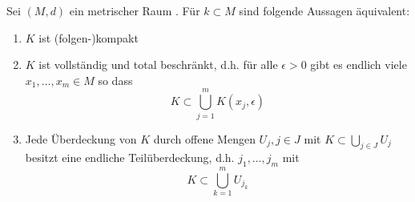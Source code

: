 \begin{satz} \label{satz:6.5}
	Sei $(M, d)$ ein metrischer Raum . Für $k \subset M$ sind folgende Aussagen äquivalent:
	\begin{enumerate}[label=\alph*\upshape)]
		\label{satz:6.5a}
		\item $K$ ist (folgen-)kompakt 
		\label{satz:6.5b}
		\item $K$ ist vollständig und total beschränkt, d.h. für alle $\epsilon > 0$ gibt es endlich viele $x_{1}, \dotsc, x_{m} \in M$ so dass
			\[ K \subset \bigcup_{j = 1}^{m} K(x_{j}, \epsilon) \]
		\label{satz:6.5c}
		\item Jede Überdeckung von $K$ durch offene Mengen $U_{j}, j \in J$ mit $K \subset \bigcup_{j \in J} U_{j}$ besitzt eine endliche Teilüberdeckung, d.h. $j_{1}, \dotsc, j_{m}$ mit
			\[ K \subset \bigcup_{k = 1}^{m} U_{j_{k}} \]
	\end{enumerate}
\end{satz}
